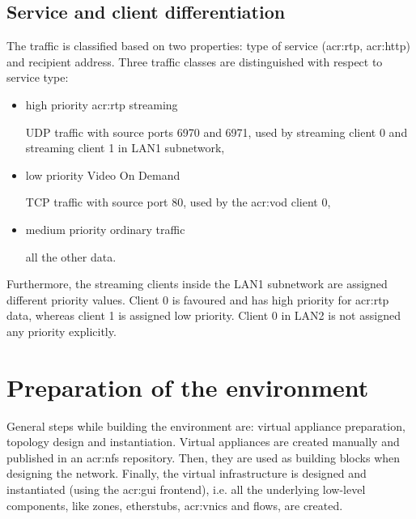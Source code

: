 \documentclass[11pt]{book}
\begin{document}
      \subsection{Service and client differentiation}
      \label{sub:uc:diff}

        The traffic is classified based on two properties: type of service (\gls{acr:rtp}, \gls{acr:http}) and recipient
        address. Three traffic classes are distinguished with respect to service type:

        \begin{itemize}

          \item high priority \gls{acr:rtp} streaming

                UDP traffic with source ports 6970 and 6971, used by streaming client 0
                and streaming client 1 in LAN1 subnetwork,

          \item low priority Video On Demand
          
                TCP traffic with source port 80, used by the \gls{acr:vod} client 0,

          \item medium priority ordinary traffic
          
                all the other data.

        \end{itemize}

        Furthermore, the streaming clients inside the LAN1 subnetwork are assigned different priority values. Client 0
        is favoured and has high priority for \gls{acr:rtp} data, whereas client 1 is assigned low priority. Client 0 in
        LAN2 is not assigned any priority explicitly.


    \section{Preparation of the environment}
    \label{sec:uc:prep}

      General steps while building the environment are: virtual appliance preparation, topology design and
      instantiation. Virtual appliances are created manually and published in an \gls{acr:nfs} repository. Then, they
      are used as building blocks when designing the network. Finally, the virtual infrastructure is designed and
      instantiated (using the \gls{acr:gui} frontend), i.e.  all the underlying low-level components, like zones,
      etherstubs, \gls{acr:vnic}s and flows, are created.
\end{document}
